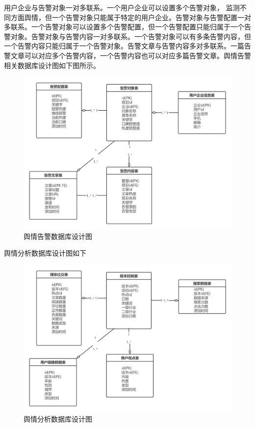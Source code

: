 用户企业与告警对象一对多联系。一个用户企业可以设置多个告警对象， 监测不同方面舆情，但一个告警对象只能属于特定的用户企业。告警对象与告警配置一对多联系。一个告警对象可以设置多个告警配置，但一个告警配置只能归属于一个告警对象。告警对象与告警内容一对多联系。一个告警对象可以有多条告警内容，但一个告警内容只能归属于一个告警对象。告警文章与告警内容多对多联系。一篇告警文章可以对应多个告警内容，一个告警内容也可以对应多篇告警文章。舆情告警相关数据库设计图如下图所示。

\begin{figure}[!htbp]
	\centering
	\includegraphics[scale=0.3]{image/d1.png}
	\caption{舆情告警数据库设计图}
\end{figure}

舆情分析数据库设计图如下

\begin{figure}[!htbp]
	\centering
	\includegraphics[scale=0.3]{image/d2.png}
	\caption{舆情分析数据库设计图}
\end{figure}

